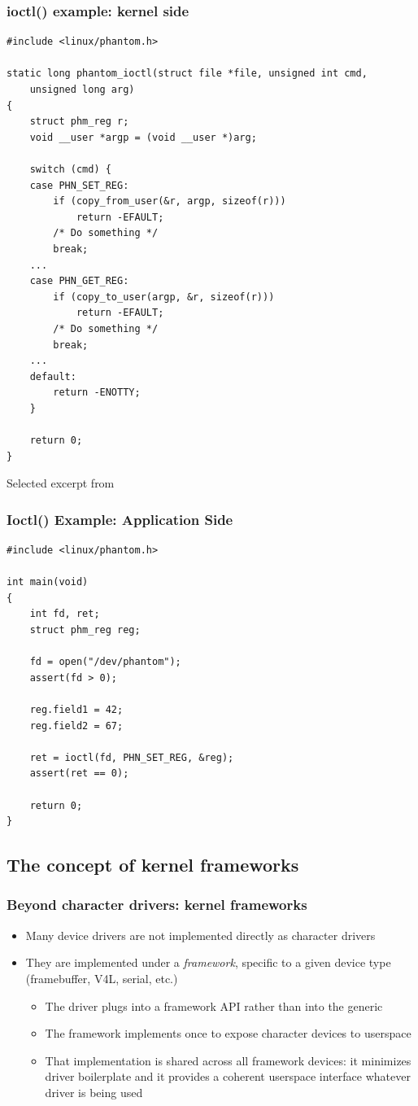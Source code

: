 \begin{frame}[fragile]
  \frametitle{ioctl() example: kernel side}
\begin{verbatim}
#include <linux/phantom.h>

static long phantom_ioctl(struct file *file, unsigned int cmd,
    unsigned long arg)
{
    struct phm_reg r;
    void __user *argp = (void __user *)arg;

    switch (cmd) {
    case PHN_SET_REG:
        if (copy_from_user(&r, argp, sizeof(r)))
            return -EFAULT;
        /* Do something */
        break;
    ...
    case PHN_GET_REG:
        if (copy_to_user(argp, &r, sizeof(r)))
            return -EFAULT;
        /* Do something */
        break;
    ...
    default:
        return -ENOTTY;
    }

    return 0;
}
\end{verbatim}
\small Selected excerpt from 
\end{frame}

\begin{frame}[fragile]
  \frametitle{Ioctl() Example: Application Side}
\begin{verbatim}
#include <linux/phantom.h>

int main(void)
{
    int fd, ret;
    struct phm_reg reg;

    fd = open("/dev/phantom");
    assert(fd > 0);

    reg.field1 = 42;
    reg.field2 = 67;

    ret = ioctl(fd, PHN_SET_REG, &reg);
    assert(ret == 0);

    return 0;
}
\end{verbatim}
\end{frame}

\subsection{The concept of kernel frameworks}

\begin{frame}
  \frametitle{Beyond character drivers: kernel frameworks}
  \begin{itemize}
  \item Many device drivers are not implemented directly as character
    drivers
  \item They are implemented under a \emph{framework}, specific to a
    given device type (framebuffer, V4L, serial, etc.)
    \begin{itemize}
    \item The driver plugs into a framework API rather than into the
      generic 
    \item The framework implements once  to
      expose character devices to userspace
    \item That implementation is shared across all framework devices: it
      minimizes driver boilerplate and it provides a coherent userspace
      interface whatever driver is being used
    \end{itemize}
  \end{itemize}
\end{frame}

